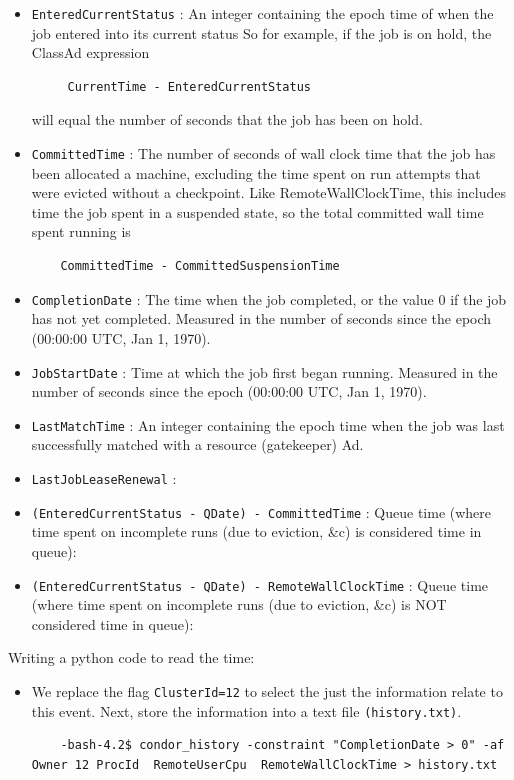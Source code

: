 \documentclass{article}
\begin{document}
\begin{itemize}
\item \verb+EnteredCurrentStatus+ : An integer containing the epoch time of when the job entered into its current status So for example, if the job is on hold, the ClassAd expression
\scriptsize
\begin{verbatim}
     CurrentTime - EnteredCurrentStatus
\end{verbatim}
\normalsize
will equal the number of seconds that the job has been on hold.
\item \verb+CommittedTime+ : The number of seconds of wall clock time that the job has been allocated a machine, excluding the time spent on run attempts that were evicted without a checkpoint. Like RemoteWallClockTime, this includes time the job spent in a suspended state, so the total committed wall time spent running is
\scriptsize
\begin{verbatim}
    CommittedTime - CommittedSuspensionTime
\end{verbatim}
\normalsize
\item \verb+CompletionDate+ : The time when the job completed, or the value 0 if the job has not yet completed. Measured in the number of seconds since the epoch (00:00:00 UTC, Jan 1, 1970).
\item \verb+JobStartDate+ : Time at which the job first began running. Measured in the number of seconds since the epoch (00:00:00 UTC, Jan 1, 1970).
\item \verb+LastMatchTime+ : An integer containing the epoch time when the job was last successfully matched with a resource (gatekeeper) Ad.
\item \verb+LastJobLeaseRenewal+ :
\item \verb+(EnteredCurrentStatus - QDate) - CommittedTime+ : Queue time (where time spent on incomplete runs (due to eviction, \&c) is considered time in queue):
\item \verb+(EnteredCurrentStatus - QDate) - RemoteWallClockTime+ : Queue time (where time spent on incomplete runs (due to eviction, \&c) is NOT considered time in queue):
\end{itemize}
Writing a python code to read the time:
\begin{itemize}
\item We replace the flag \verb+ClusterId=12+ to select the just the information relate to this event. Next, store the information into a text file \verb+(history.txt)+. 
\scriptsize
\begin{verbatim}
    -bash-4.2$ condor_history -constraint "CompletionDate > 0" -af Owner 12 ProcId  RemoteUserCpu  RemoteWallClockTime > history.txt
\end{verbatim}
\normalsize
\end{itemize}
\end{document}
